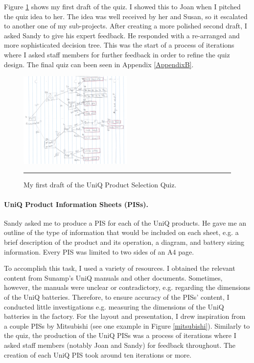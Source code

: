 Figure \ref{quiz_draft} shows my first draft of the quiz.
I showed this to Joan when I pitched the quiz idea to her.
The idea was well received by her and Susan, so it escalated to another one of my sub-projects.
After creating a more polished second draft, I asked Sandy to give his expert feedback.
He responded with a re-arranged and more sophisticated decision tree.
This was the start of a process of iterations where I asked staff members for further feedback in order to refine the quiz design.
The final quiz can been seen in Appendix \ref{AppendixB}.


\begin{figure}[htbp]
	\centering
	\includegraphics[width=0.5\textwidth]{figures/QuizSketch.png}
	\rule{\textwidth}{0.5pt} %
	\caption{My first draft of the UniQ Product Selection Quiz.}
	\label{quiz_draft}
\end{figure}



\paragraph{UniQ Product Information Sheets (PISs).}

Sandy asked me to produce a PIS for each of the UniQ products.
He gave me an outline of the type of information that would be included on each sheet, e.g. a brief description of the product and its operation, a diagram, and battery sizing information.
Every PIS was limited to two sides of an A4 page.

To accomplish this task, I used a variety of resources.
I obtained the relevant content from Sunamp's UniQ manuals and other documents.
Sometimes, however, the manuals were unclear or contradictory, e.g. regarding the dimensions of the UniQ batteries.
Therefore, to ensure accuracy of the PISs' content, I conducted little investigations e.g. measuring the dimensions of the UniQ batteries in the factory.
For the layout and presentation, I drew inspiration from a couple PISs by Mitsubishi (see one example in Figure \ref{mitsubishi}).
Similarly to the quiz, the production of the UniQ PISs was a process of iterations where I asked staff members (notably Joan and Sandy) for feedback throughout.
The creation of each UniQ PIS took around ten iterations or more.


